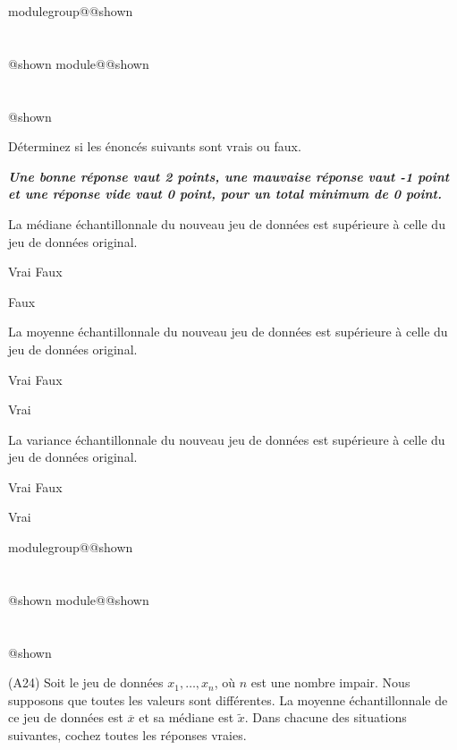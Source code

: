 \documentclass{Evaluation}
\makeatletter
\newcommand{\currentmodulekey}{}
\newcommand{\currentmoduletitle}{}
\newcommand{\currentgroupkey}{}
\newcommand{\currentgrouptitle}{}
\newcommand{\showmoduleifneeded}{%
  \ifx\currentgroupkey\empty\else
    \expandafter\ifx\csname modulegroup@\currentgroupkey @shown\endcsname\relax
      \section*{\currentgrouptitle}%
      \expandafter\gdef\csname modulegroup@\currentgroupkey @shown\endcsname{1}%
    \fi
  \fi
  \expandafter\ifx\csname module@\currentmodulekey @shown\endcsname\relax
    \section*{\currentmoduletitle}%
    \expandafter\gdef\csname module@\currentmodulekey @shown\endcsname{1}%
  \fi
}
\newenvironment{H23}{\showmoduleifneeded}{}
\newenvironment{A24}{\showmoduleifneeded}{}
\makeatother
\begin{document}
\begin{questions}
\begin{H23}
\begin{parts}
Déterminez si les énoncés suivants sont vrais ou faux. 

\textbf{\textit{Une bonne réponse vaut 2 points, une mauvaise réponse vaut -1 point et une réponse vide vaut 0 point, pour un total minimum de 0 point.}}

\begin{subparts}
\subpart La médiane échantillonnale du nouveau jeu de données est supérieure à celle du jeu de données original.

    \begin{oneparcheckboxes}
        \choice Vrai
        \correctchoice Faux
    \end{oneparcheckboxes}
    
\begin{solution}
    Faux
\end{solution}

\subpart La moyenne échantillonnale du nouveau jeu de données est supérieure à celle du jeu de données original.

    \begin{oneparcheckboxes}
        \correctchoice Vrai
        \choice Faux
    \end{oneparcheckboxes}
    
\begin{solution}
    Vrai
\end{solution}

\subpart La variance échantillonnale du nouveau jeu de données est supérieure à celle du jeu de données original.

    \begin{oneparcheckboxes}
        \correctchoice Vrai
        \choice Faux
    \end{oneparcheckboxes}
    
\begin{solution}
    Vrai
\end{solution}

\end{subparts}
\end{parts}
\end{H23}

\begin{A24}
\question
(A24) Soit le jeu de données $x_1,\hdots,x_n$, où $n$ est une nombre impair. Nous supposons que toutes les valeurs sont différentes. La moyenne échantillonnale de ce jeu de données est $\overline{x}$ et sa médiane est $\widetilde{x}$.
Dans chacune des situations suivantes, cochez toutes les réponses vraies.
\begin{parts}

\end{parts}
\end{A24}
\end{questions}
\end{document}
